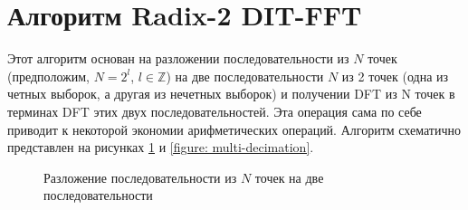 \section{Алгоритм Radix-2 DIT-FFT}
Этот алгоритм основан на разложении последовательности из $N$ точек (предположим, $N = 2^l$, $l\in\mathbb{Z}$) на две последовательности $N$ из 2 точек (одна из четных выборок, а другая из нечетных выборок) и получении DFT из N точек в терминах DFT этих двух последовательностей. Эта операция сама по себе приводит к некоторой экономии арифметических операций. Алгоритм схематично представлен на рисунках \ref{figure: one decimation} и \ref{figure: multi-decimation}.
\begin{figure}[ht]
\centering
\caption{Разложение последовательности из $N$ точек на две последовательности}
\label{figure: one decimation}
\end{figure}
